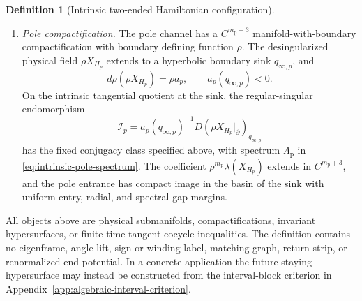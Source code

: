\documentclass[11pt]{amsart}
\numberwithin{equation}{section}
\theoremstyle{definition}
\newtheorem{definition}[theorem]{Definition}
\theoremstyle{remark}
\begin{document}
\begin{definition}[Intrinsic two-ended Hamiltonian configuration]
\begin{enumerate}
The interval-block hypotheses in
Theorem~\ref{thm:algebraic-corridor-graph} give a computable sufficient
criterion for the existence, local maximality, and bunching of this
hypersurface.  The product trivialization and its cone estimates are not
part of the intrinsic hypothesis.
A physical cut $e=e_*$ in the interior of the collar and a finite
first-hit/saturation map from a fixed open neighborhood of the whole
compact cut slice to the algebraic event face are part of the data, with
compact closure and uniform first-hit and coorientation margins.  Its
domain contains a fixed neighborhood of
$\mathcal W^{\rm tail}_{\mathrm a,p}\cap\{e=e_*\}$.

\item \emph{Pole compactification.}
The pole channel has a $C^{m_{\mathrm p}+3}$
manifold-with-boundary compactification with
boundary defining function $\rho$.  The desingularized physical field
$\rho X_{H_p}$ extends to a hyperbolic boundary sink $q_{\infty,p}$, and
\[
 d\rho(\rho X_{H_p})=\rho a_p,\qquad a_p(q_{\infty,p})<0.
\]
On the intrinsic tangential quotient at the sink, the regular-singular
endomorphism
\begin{equation}\label{eq:intrinsic-pole-indicial-map}
\mathcal I_p=a_p(q_{\infty,p})^{-1}
 D(\rho X_{H_p}|_{\partial})_{q_{\infty,p}}
\end{equation}
has the fixed conjugacy class specified above, with spectrum
$\Lambda_{\mathrm p}$ in \eqref{eq:intrinsic-pole-spectrum}.
The coefficient $\rho^{m_{\mathrm p}}\lambda(X_{H_p})$ extends in
$C^{m_{\mathrm p}+3}$, and the pole
entrance has compact image in the basin of the sink with uniform entry,
radial, and spectral-gap margins.
\end{enumerate}
All objects above are physical submanifolds, compactifications, invariant
hypersurfaces, or finite-time tangent-cocycle inequalities.  The
definition contains no eigenframe, angle lift, sign or winding label,
matching graph, return strip, or renormalized end potential.  In a
concrete application the future-staying hypersurface may instead be
constructed from the interval-block criterion in
Appendix~\ref{app:algebraic-interval-criterion}.
\end{definition}
\end{document}
